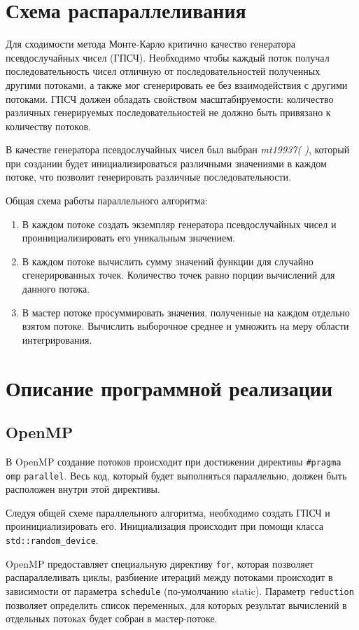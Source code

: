 \documentclass{report}
\begin{document}
\section*{Схема распараллеливания}
Для сходимости метода Монте-Карло критично качество генератора псевдослучайных чисел (ГПСЧ). Необходимо чтобы каждый поток получал последовательность чисел отличную от последовательностей полученных другими потоками, а также мог сгенерировать ее без взаимодействия с другими потоками. ГПСЧ должен обладать свойством масштабируемости: количество различных генерируемых последовательностей не должно быть привязано к количеству потоков.
\par В качестве генератора псевдослучайных чисел был выбран \emph{mt19937( )}, который при создании будет инициализироваться различными значениями в каждом потоке, что позволит генерировать различные последовательности. 
\par Общая схема работы параллельного алгоритма:
\begin{enumerate}
\item В каждом потоке создать экземпляр генератора псевдослучайных чисел и проинициализировать его уникальным значением.
\item В каждом потоке вычислить сумму значений функции для случайно сгенерированных точек. Количество точек равно порции вычислений для данного потока.
\item В мастер потоке просуммировать значения, полученные на каждом отдельно взятом потоке. Вычислить выборочное среднее и умножить на меру области интегрирования.
\end{enumerate}
\newpage

\section*{Описание программной реализации}
\subsection*{OpenMP}
\par В OpenMP создание потоков происходит при достижении директивы \verb|#pragma omp| \verb|parallel|. Весь код, который будет выполняться параллельно, должен быть расположен внутри этой директивы.
\par Следуя общей схеме параллельного алгоритма, необходимо создать ГПСЧ и проинициализировать его. Инициализация происходит при помощи класса \verb|std::random_device|.
\par OpenMP предоставляет специальную директиву \verb|for|, которая позволяет распараллеливать циклы, разбиение итераций между потоками происходит в зависимости от параметра \verb|schedule| (по-умолчанию static). Параметр \verb|reduction| позволяет определить список переменных, для которых результат вычислений в отдельных потоках будет собран в мастер-потоке.
\end{document}
